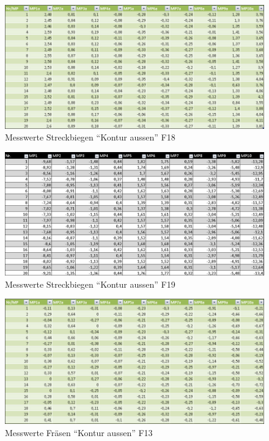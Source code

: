 \documentclass[12pt,a4paper,parskip]{scrartcl}
\begin{document}
\begin{figure}[hbtp]
\centering
\includegraphics[width=1\textwidth]{F18Bieg.jpg}
\caption{Messwerte Streckbiegen "`Kontur aussen"' F18}
\end{figure}
\begin{figure}[hbtp]
\centering
\includegraphics[width=1\textwidth]{F19Bieg.jpg}
\caption{Messwerte Streckbiegen "`Kontur aussen"' F19}
\end{figure}
\begin{figure}[hbtp]
\centering
\includegraphics[width=1\textwidth]{F13fraes.jpg}
\caption{Messwerte Fräsen "`Kontur aussen"' F13 }
\end{figure}

\clearpage
\end{document}

